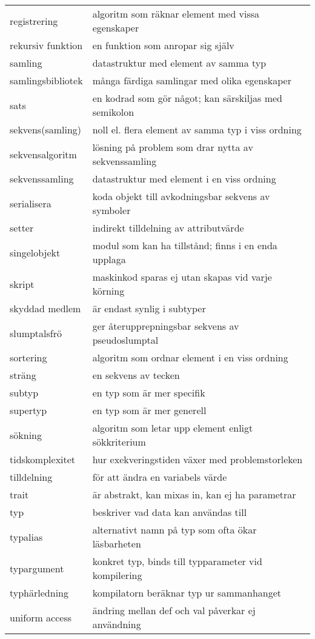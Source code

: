 \begin{tabular}{l|l}
registrering & algoritm som räknar element med vissa egenskaper \\
rekursiv funktion & en funktion som anropar sig själv \\
samling & datastruktur med element av samma typ \\
samlingsbibliotek & många färdiga samlingar med olika egenskaper \\
sats & en kodrad som gör något; kan särskiljas med semikolon \\
sekvens(samling) & noll el. flera element av samma typ i viss ordning \\
sekvensalgoritm & lösning på problem som drar nytta av sekvenssamling \\
sekvenssamling & datastruktur med element i en viss ordning \\
serialisera & koda objekt till avkodningsbar sekvens av symboler \\
setter & indirekt tilldelning av attributvärde \\
singelobjekt & modul som kan ha tillstånd; finns i en enda upplaga \\
skript & maskinkod sparas ej utan skapas vid varje körning \\
skyddad medlem & är endast synlig i subtyper \\
slumptalsfrö & ger återupprepningsbar sekvens av pseudoslumptal \\
sortering & algoritm som ordnar element i en viss ordning \\
sträng & en sekvens av tecken \\
subtyp & en typ som är mer specifik \\
supertyp & en typ som är mer generell \\
sökning & algoritm som letar upp element enligt sökkriterium \\
tidskomplexitet & hur exekveringstiden växer med problemstorleken \\
tilldelning & för att ändra en variabels värde \\
trait & är abstrakt, kan mixas in, kan ej ha parametrar \\
typ & beskriver vad data kan användas till \\
typalias & alternativt namn på typ som ofta ökar läsbarheten \\
typargument & konkret typ, binds till typparameter vid kompilering \\
typhärledning & kompilatorn beräknar typ ur sammanhanget \\
uniform access & ändring mellan def och val påverkar ej användning \\

\end{tabular}
